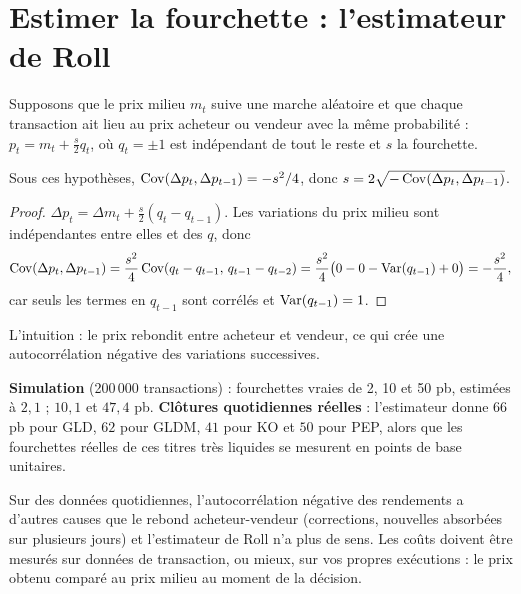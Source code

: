 \section{Estimer la fourchette : l'estimateur de Roll}

Supposons que le prix milieu $m_t$ suive une marche aléatoire et que chaque transaction ait lieu au prix acheteur ou vendeur avec la même probabilité : $p_t = m_t + \frac s2 q_t$, où $q_t = \pm1$ est indépendant de tout le reste et $s$ la fourchette.

\begin{proposition}[Roll]\label{c12:prop:roll}
Sous ces hypothèses, $\operatorname{Cov}(\Delta p_t,\Delta p_{t-1}) = -s^2/4$, donc $s = 2\sqrt{-\operatorname{Cov}(\Delta p_t,\Delta p_{t-1})}$.
\end{proposition}
\begin{proof}
$\Delta p_t = \Delta m_t + \frac s2(q_t - q_{t-1})$. Les variations du prix milieu sont indépendantes entre elles et des $q$, donc
\[
\operatorname{Cov}(\Delta p_t,\Delta p_{t-1}) = \frac{s^2}4\operatorname{Cov}(q_t - q_{t-1},\, q_{t-1} - q_{t-2}) = \frac{s^2}4\big(0 - 0 - \operatorname{Var}(q_{t-1}) + 0\big) = -\frac{s^2}4,
\]
car seuls les termes en $q_{t-1}$ sont corrélés et $\operatorname{Var}(q_{t-1}) = 1$.
\end{proof}

L'intuition : le prix \og rebondit\fg{} entre acheteur et vendeur, ce qui crée une autocorrélation négative des variations successives.

\begin{codebox}
\textbf{Simulation} (200\,000 transactions) : fourchettes vraies de 2, 10 et 50 pb, estimées à $2{,}1$ ; $10{,}1$ et $47{,}4$ pb. \textbf{Clôtures quotidiennes réelles} : l'estimateur donne $66$ pb pour GLD, $62$ pour GLDM, $41$ pour KO et $50$ pour PEP, alors que les fourchettes réelles de ces titres très liquides se mesurent en points de base unitaires.
\end{codebox}

\begin{pitfall}
Sur des données quotidiennes, l'autocorrélation négative des rendements a d'autres causes que le rebond acheteur-vendeur (corrections, nouvelles absorbées sur plusieurs jours) et l'estimateur de Roll n'a plus de sens. Les coûts doivent être mesurés sur données de transaction, ou mieux, sur vos propres exécutions : le prix obtenu comparé au prix milieu au moment de la décision.
\end{pitfall}

